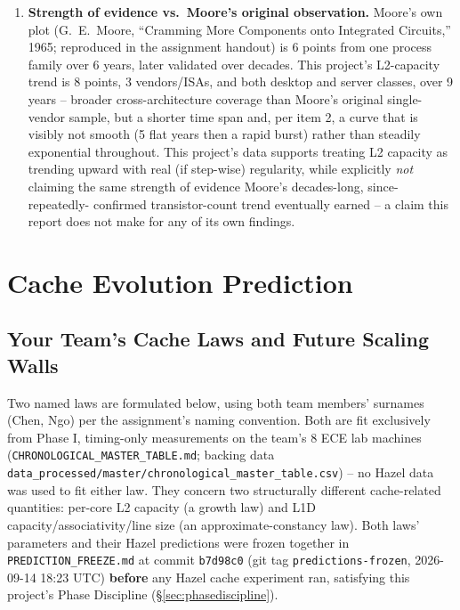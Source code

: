 \documentclass{article}
\begin{document}
\begin{enumerate}
    Section~\ref{sec:hazel}, which freezes the lab-only prediction (already committed and
    tagged \emph{before} any Hazel cache experiment ran, Section~\ref{sec:cachelaws}) and
    then reveals all 6 held-out Hazel generations' measurements against it.
    \item \textbf{Strength of evidence vs.\ Moore's original observation.} Moore's own plot
    (G.\ E.\ Moore, ``Cramming More Components onto Integrated Circuits,'' 1965; reproduced
    in the assignment handout) is 6 points from one process family over 6 years, later
    validated over decades. This project's L2-capacity trend is 8 points, 3
    vendors/ISAs, and both desktop and server classes, over 9 years -- broader
    cross-architecture coverage than Moore's original single-vendor sample, but a shorter
    time span and, per item 2, a curve that is visibly not smooth (5 flat years then a rapid
    burst) rather than steadily exponential throughout. This project's data supports treating
    L2 capacity as trending upward with real (if step-wise) regularity, while explicitly
    \emph{not} claiming the same strength of evidence Moore's decades-long, since-repeatedly-
    confirmed transistor-count trend eventually earned -- a claim this report does not make
    for any of its own findings.
\end{enumerate}

\section{Cache Evolution Prediction}

\subsection{Your Team's Cache Laws and Future Scaling Walls}
\label{sec:cachelaws}

Two named laws are formulated below, using both team members' surnames (Chen, Ngo) per the
assignment's naming convention. Both are fit exclusively from Phase I, timing-only measurements on
the team's 8 ECE lab machines (\texttt{CHRONOLOGICAL\_MASTER\_TABLE.md}; backing data
\texttt{data\_processed/master/chronological\_master\_table.csv}) -- no Hazel data was used to fit
either law. They concern two structurally different cache-related quantities: per-core L2 capacity (a growth law) and L1D capacity/associativity/line size (an
approximate-constancy law). Both laws' parameters and their Hazel predictions were frozen together in
\texttt{PREDICTION\_FREEZE.md} at commit \texttt{b7d98c0} (git tag \texttt{predictions-frozen},
2026-09-14 18:23 UTC) \textbf{before} any Hazel cache experiment ran, satisfying this project's Phase
Discipline (\S\ref{sec:phasediscipline}).
\end{document}
